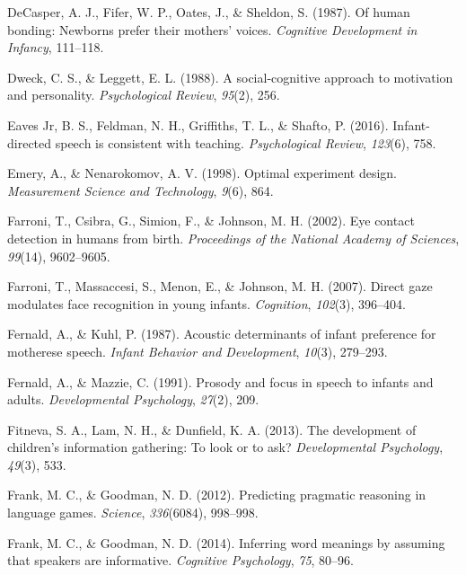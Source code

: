 \documentclass[oneside]{report}
\begin{document}
\hypertarget{ref-decasper1987human}{}
DeCasper, A. J., Fifer, W. P., Oates, J., \& Sheldon, S. (1987). Of
human bonding: Newborns prefer their mothers' voices. \emph{Cognitive
Development in Infancy}, 111--118.

\hypertarget{ref-dweck1988social}{}
Dweck, C. S., \& Leggett, E. L. (1988). A social-cognitive approach to
motivation and personality. \emph{Psychological Review}, \emph{95}(2),
256.

\hypertarget{ref-eaves2016infant}{}
Eaves Jr, B. S., Feldman, N. H., Griffiths, T. L., \& Shafto, P. (2016).
Infant-directed speech is consistent with teaching. \emph{Psychological
Review}, \emph{123}(6), 758.

\hypertarget{ref-emery1998optimal}{}
Emery, A., \& Nenarokomov, A. V. (1998). Optimal experiment design.
\emph{Measurement Science and Technology}, \emph{9}(6), 864.

\hypertarget{ref-farroni2002eye}{}
Farroni, T., Csibra, G., Simion, F., \& Johnson, M. H. (2002). Eye
contact detection in humans from birth. \emph{Proceedings of the
National Academy of Sciences}, \emph{99}(14), 9602--9605.

\hypertarget{ref-farroni2007direct}{}
Farroni, T., Massaccesi, S., Menon, E., \& Johnson, M. H. (2007). Direct
gaze modulates face recognition in young infants. \emph{Cognition},
\emph{102}(3), 396--404.

\hypertarget{ref-fernald1987acoustic}{}
Fernald, A., \& Kuhl, P. (1987). Acoustic determinants of infant
preference for motherese speech. \emph{Infant Behavior and Development},
\emph{10}(3), 279--293.

\hypertarget{ref-fernald1991prosody}{}
Fernald, A., \& Mazzie, C. (1991). Prosody and focus in speech to
infants and adults. \emph{Developmental Psychology}, \emph{27}(2), 209.

\hypertarget{ref-fitneva2013development}{}
Fitneva, S. A., Lam, N. H., \& Dunfield, K. A. (2013). The development
of children's information gathering: To look or to ask?
\emph{Developmental Psychology}, \emph{49}(3), 533.

\hypertarget{ref-frank2012predicting}{}
Frank, M. C., \& Goodman, N. D. (2012). Predicting pragmatic reasoning
in language games. \emph{Science}, \emph{336}(6084), 998--998.

\hypertarget{ref-frank2014inferring}{}
Frank, M. C., \& Goodman, N. D. (2014). Inferring word meanings by
assuming that speakers are informative. \emph{Cognitive Psychology},
\emph{75}, 80--96.
\end{document}
